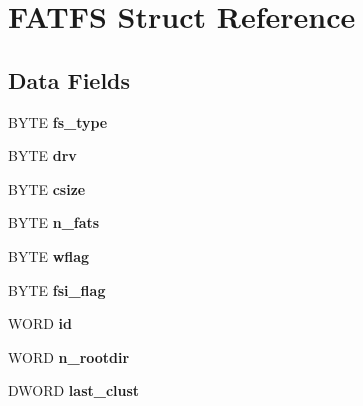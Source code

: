 \hypertarget{struct_f_a_t_f_s}{}\section{F\+A\+T\+FS Struct Reference}
\label{struct_f_a_t_f_s}
\subsection*{Data Fields}
\begin{DoxyCompactItemize}
\item 
\mbox{\label{struct_f_a_t_f_s_add27d97babe807b573eac98a71dc4ae5}} 
B\+Y\+TE {\bfseries fs\+\_\+type}
\item 
\mbox{\label{struct_f_a_t_f_s_a6a791560e2687e8b1569bfce61208d2d}} 
B\+Y\+TE {\bfseries drv}
\item 
\mbox{\label{struct_f_a_t_f_s_a504a1175f6dcc9a854b9da94463bd108}} 
B\+Y\+TE {\bfseries csize}
\item 
\mbox{\label{struct_f_a_t_f_s_a56716c7e7ac10cf46e73ffb2a2e9b545}} 
B\+Y\+TE {\bfseries n\+\_\+fats}
\item 
\mbox{\label{struct_f_a_t_f_s_a647e43c9ccae94b7274793d1909897de}} 
B\+Y\+TE {\bfseries wflag}
\item 
\mbox{\label{struct_f_a_t_f_s_a84e9cdc5a6a8e33ea7ec192058abf161}} 
B\+Y\+TE {\bfseries fsi\+\_\+flag}
\item 
\mbox{\label{struct_f_a_t_f_s_a417095d7c20d56d417dc0998e0dd5a5c}} 
W\+O\+RD {\bfseries id}
\item 
\mbox{\label{struct_f_a_t_f_s_a189a00aa038044ffad0fc7f7dcf2aae1}} 
W\+O\+RD {\bfseries n\+\_\+rootdir}
\item 
\mbox{\label{struct_f_a_t_f_s_ad315def289218e26ab78ff90fde700d1}} 
D\+W\+O\+RD {\bfseries last\+\_\+clust}
\item 
\mbox{\label{struct_f_a_t_f_s_a5fb49e6ac511bd97eaffdd636d0e4165}} 

\end{DoxyCompactItemize}
